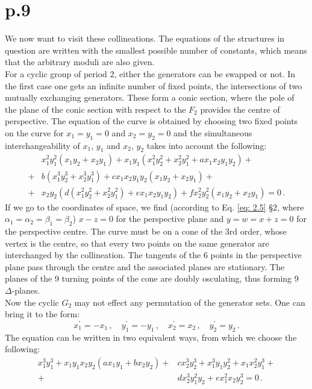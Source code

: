 \documentclass[leqno]{article}
\begin{document}
\section{p.9}
We now want to visit these collineations. The equations of the structures in question are written with the smallest possible number of constants, which means that the arbitrary moduli are also given. \\
For a cyclic group of period 2, either the generators can be swapped or not. In the first case one gets an infinite number of fixed points, the intersections of two mutually exchanging generators. These form a conic section, where the pole of the plane of the conic section with respect to the $F_2$ provides the centre of perspective. The equation of the curve is obtained by choosing two fixed points on the curve for $x_1 = y_1 = 0$ and $x_2 = y_2 = 0$ and the simultaneous interchangeability of $x_1$, $y_1$ and $x_2 $, $y_2$ takes into account the following:
\begin{align}\label{eq: 3.1}
 & x_1^2 y_1^2 (x_1 y_2 + x_2 y_1) + x_1 y_1(x_1^2 y_2^2 + x_2^2 y_1^2 + a x_1 x_2 y_1 y_2) + \nonumber \\
 +& b(x_1^3 y_2^3 + x_2^3 y_1^3) + c x_1 x_2 y_1 y_2 (x_1 y_2 + x_2 y_1) +  \tag{1}\\
 +& x_2 y_2 (d(x_1^2 y_2^2 + x_2^2 y_1^2) + ex_1 x_2 y_1 y_2) + f x_2^2 y_2^2  (x_1 y_2 + x_2 y_1) =0 \, . \nonumber
\end{align}
If we go to the coordinates of space, we find (according to Eq. \eqref{eq: 2.5} \S 2, where $\alpha_1 = \alpha_2 = \beta_1 = \beta_2$) $x-z=0$ for the perspective plane  and $y=w=x+z=0$ for the perspective centre. The curve must be on a cone of the 3rd order, whose vertex is the centre, so that every two points on the same generator are interchanged by the collineation. The tangents of the 6 points in the perspective plane pass through the centre and the associated planes are stationary. The planes of the 9 turning points of the cone are doubly osculating, thus forming 9 $\Delta$-planes. \\
Now the cyclic $G_2$ may not effect any permutation of the generator sets. One can bring it to the form:
\[
x_1^\prime = -x_1 \, , \quad y_1^\prime = - y_1 \, , \quad x_2^\prime = x_2 \, , \quad y_2^\prime = y_2 \, .   
\]
The equation can be written in two equivalent ways, from which we choose the following:
\begin{align}\label{eq: 3.2}
	x_1^3 y_1^3 + x_1 y_1 x_2 y_2 (ax_1 y_1 + b x_2 y_2) +& c x_2^3 y_2^3 +x_1^3 y_1 y_2^2 + x_1 x_2^2 y_1^3 + \tag{2} \\ 
	+& d x_2^3 y_1^2 y_2 + e x_1^2 x_2 y_2^3 = 0 \, .  \nonumber 
\end{align}
\end{document}
